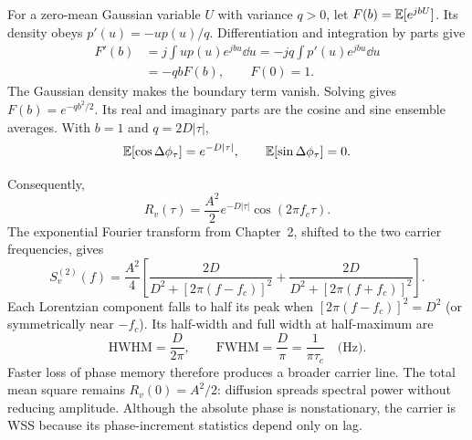 \begin{derivation}[breakable=false,title={Ensemble average of a Gaussian phase increment}]
For a zero-mean Gaussian variable $U$ with variance $q>0$, let
$F(b)=\mathbb E[e^{jbU}]$. Its density obeys $p'(u)=-up(u)/q$. Differentiation and integration by parts give
\[
\begin{aligned}
F'(b)&=j\int up(u)e^{jbu}\dd u
=-jq\int p'(u)e^{jbu}\dd u\\
&=-qbF(b),\qquad F(0)=1.
\end{aligned}
\]
The Gaussian density makes the boundary term vanish. Solving gives
$F(b)=e^{-qb^2/2}$. Its real and imaginary parts are the cosine and sine ensemble averages. With $b=1$ and $q=2D|\tau|$,
\[
\mathbb E[\cos\Delta\phi_\tau]=e^{-D|\tau|},
\qquad \mathbb E[\sin\Delta\phi_\tau]=0.
\]
\end{derivation}
Consequently,
\begin{equation}
R_v(\tau)=\frac{A^2}{2}e^{-D|\tau|}\cos(2\pi f_c\tau).
\end{equation}
The exponential Fourier transform from Chapter~2, shifted to the two carrier frequencies, gives
\begin{equation}
S_v^{(2)}(f)=\frac{A^2}{4}\left[
\frac{2D}{D^2+[2\pi(f-f_c)]^2}
+\frac{2D}{D^2+[2\pi(f+f_c)]^2}\right].
\end{equation}
Each Lorentzian component falls to half its peak when $[2\pi(f-f_c)]^2=D^2$ (or symmetrically near $-f_c$). Its half-width and full width at half-maximum are
\[
\boxed{\mathrm{HWHM}=\frac{D}{2\pi},\qquad
\mathrm{FWHM}=\frac{D}{\pi}=\frac{1}{\pi\tau_c}
\quad\text{(Hz)}.}
\]
Faster loss of phase memory therefore produces a broader carrier line. The total mean square remains $R_v(0)=A^2/2$: diffusion spreads spectral power without reducing amplitude. Although the absolute phase is nonstationary, the carrier is WSS because its phase-increment statistics depend only on lag.
